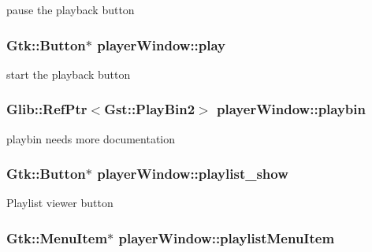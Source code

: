 pause the playback button \hypertarget{classplayerWindow_a81cfbb843e2371f1b9bfb8c05dd4b56b}{
\subsubsection[{play}]{\setlength{\rightskip}{0pt plus 5cm}Gtk\-::\-Button$\ast$ player\-Window\-::play\hspace{0.3cm}{\ttfamily [protected]}}}\label{classplayerWindow_a81cfbb843e2371f1b9bfb8c05dd4b56b}
start the playback button \hypertarget{classplayerWindow_a353a7c272adc8827765d5489255f989b}{
\subsubsection[{playbin}]{\setlength{\rightskip}{0pt plus 5cm}Glib\-::\-Ref\-Ptr$<$Gst\-::\-Play\-Bin2$>$ player\-Window\-::playbin\hspace{0.3cm}{\ttfamily [protected]}}}\label{classplayerWindow_a353a7c272adc8827765d5489255f989b}
playbin needs more documentation \hypertarget{classplayerWindow_a6eb8371f71ff2dd2b9e6df87577b5c3f}{
\subsubsection[{playlist\-\_\-show}]{\setlength{\rightskip}{0pt plus 5cm}Gtk\-::\-Button$\ast$ player\-Window\-::playlist\-\_\-show\hspace{0.3cm}{\ttfamily [protected]}}}\label{classplayerWindow_a6eb8371f71ff2dd2b9e6df87577b5c3f}
Playlist viewer button \hypertarget{classplayerWindow_a816eae21397d60d898fcc8aa53424b5d}{
\subsubsection[{playlist\-Menu\-Item}]{\setlength{\rightskip}{0pt plus 5cm}Gtk\-::\-Menu\-Item$\ast$ player\-Window\-::playlist\-Menu\-Item\hspace{0.3cm}{\ttfamily [protected]}}}\label{classplayerWindow_a816eae21397d60d898fcc8aa53424b5d}
